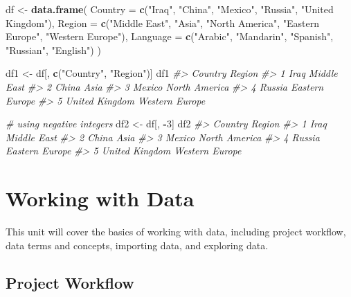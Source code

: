 \documentclass[]{book}
\newenvironment{Shaded}{\begin{snugshade}}{\end{snugshade}}
\newcommand{\KeywordTok}[1]{\textcolor[rgb]{0.13,0.29,0.53}{\textbf{#1}}}
\newcommand{\DataTypeTok}[1]{\textcolor[rgb]{0.13,0.29,0.53}{#1}}
\newcommand{\DecValTok}[1]{\textcolor[rgb]{0.00,0.00,0.81}{#1}}
\newcommand{\StringTok}[1]{\textcolor[rgb]{0.31,0.60,0.02}{#1}}
\newcommand{\CommentTok}[1]{\textcolor[rgb]{0.56,0.35,0.01}{\textit{#1}}}
\newcommand{\OperatorTok}[1]{\textcolor[rgb]{0.81,0.36,0.00}{\textbf{#1}}}
\newcommand{\NormalTok}[1]{#1}
\begin{document}
\begin{Shaded}
\begin{Highlighting}[]
\NormalTok{df <-}\StringTok{ }\KeywordTok{data.frame}\NormalTok{(}
  \DataTypeTok{Country =} \KeywordTok{c}\NormalTok{(}\StringTok{"Iraq"}\NormalTok{, }\StringTok{"China"}\NormalTok{, }\StringTok{"Mexico"}\NormalTok{, }\StringTok{"Russia"}\NormalTok{, }\StringTok{"United Kingdom"}\NormalTok{),}
  \DataTypeTok{Region =} \KeywordTok{c}\NormalTok{(}\StringTok{"Middle East"}\NormalTok{, }\StringTok{"Asia"}\NormalTok{, }\StringTok{"North America"}\NormalTok{, }\StringTok{"Eastern Europe"}\NormalTok{, }\StringTok{"Western Europe"}\NormalTok{),}
  \DataTypeTok{Language =} \KeywordTok{c}\NormalTok{(}\StringTok{"Arabic"}\NormalTok{, }\StringTok{"Mandarin"}\NormalTok{, }\StringTok{"Spanish"}\NormalTok{, }\StringTok{"Russian"}\NormalTok{, }\StringTok{"English"}\NormalTok{)}
\NormalTok{)}

\NormalTok{df1 <-}\StringTok{ }\NormalTok{df[, }\KeywordTok{c}\NormalTok{(}\StringTok{"Country"}\NormalTok{, }\StringTok{"Region"}\NormalTok{)]}
\NormalTok{df1}
\CommentTok{#>          Country         Region}
\CommentTok{#> 1           Iraq    Middle East}
\CommentTok{#> 2          China           Asia}
\CommentTok{#> 3         Mexico  North America}
\CommentTok{#> 4         Russia Eastern Europe}
\CommentTok{#> 5 United Kingdom Western Europe}

\CommentTok{# using negative integers}
\NormalTok{df2 <-}\StringTok{ }\NormalTok{df[, }\OperatorTok{-}\DecValTok{3}\NormalTok{]}
\NormalTok{df2}
\CommentTok{#>          Country         Region}
\CommentTok{#> 1           Iraq    Middle East}
\CommentTok{#> 2          China           Asia}
\CommentTok{#> 3         Mexico  North America}
\CommentTok{#> 4         Russia Eastern Europe}
\CommentTok{#> 5 United Kingdom Western Europe}
\end{Highlighting}
\end{Shaded}

\chapter{Working with Data}\label{working-with-data}

This unit will cover the basics of working with data, including project
workflow, data terms and concepts, importing data, and exploring data.

\section{Project Workflow}\label{project-workflow}
\end{document}
